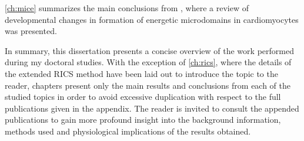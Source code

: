 \ref{ch:mice} summarizes the main conclusions from \PaperI, where
a review of developmental changes in formation of energetic microdomains
in cardiomyocytes was presented.


In summary, this dissertation presents a concise overview of the work
performed during my doctoral studies. With the exception of
\ref{ch:rics}, where the details of the extended \ac{RICS} method have been laid out to
introduce the topic to the reader, chapters present only the main
results and conclusions from each of the studied topics in order to
avoid excessive duplication with respect to the full publications given in the
appendix. The reader is invited to
consult the appended publications to gain more profound insight into
the background information, methods used and physiological implications
of the results obtained.

%
%
%
%
%




